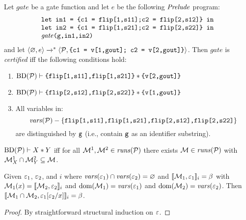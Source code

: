 \begin{definition}
  \label{definition-gmwgate-certification}
  Let $\mathit{gate}$ be a gate function and let $e$ be the following
  $\mathit{Prelude}$ program:
  $$
  \begin{array}{l}
    \texttt{let in1 = \{c1 = flip[1,s11];c2 = flip[2,s12]\} in}\\
    \texttt{let in2 = \{c1 = flip[1,s21];c2 = flip[2,s22]\} in}\\
    \mathit{gate}\texttt{(g,in1,in2)}
  \end{array}
  $$
  and let $
  \langle \varnothing,e \rangle\xrightarrow{}^{*}\langle \mathcal{P},\texttt{\{c1 = v[1,gout]; c2 = v[2,gout]\}} \rangle
  $.
  Then $\mathit{gate}$ is \emph{certified} iff the following conditions hold:
  \begin{enumerate}[\hspace{5mm}i.]
  \item $\mathrm{BD}(\mathcal{P}) \vdash \texttt{\{flip[1,s11],flip[1,s21]\}} * \texttt{\{v[2,gout]\}}$
  \item $\mathrm{BD}(\mathcal{P}) \vdash \texttt{\{flip[2,s12],flip[2,s22]\}} * \texttt{\{v[1,gout]\}}$
  \item All variables in:$$\mathit{vars}(\mathcal{P}) - \{ \texttt{flip[1,s11],flip[1,s21],flip[2,s12],flip[2,s22]}\}$$
    are distinguished by $\texttt{g}$ (i.e., contain $\texttt{g}$ as an identifier substring). 
  \end{enumerate}
\end{definition}

\begin{lemma}
  \label{lemma-sepjoin}
  $\mathrm{BD}(\mathcal{P}) \vdash X * Y$ iff for all 
  $\mathcal{M}^1, \mathcal{M}^2 \in \mathit{runs}(\mathcal{P})$ there exists
  $\mathcal{M} \in \mathit{runs}(\mathcal{P})$ with
  $\mathcal{M}^1_{X} \cap \mathcal{M}^2_{Y} \subseteq \mathcal{M}$.
\end{lemma}

\begin{lemma}
  \label{lemma-presub}
  Given $\varepsilon_1$, $\varepsilon_2$, and $i$ where $\mathit{vars}(\varepsilon_1) \cap
  \mathit{vars}(\varepsilon_2) = \varnothing$ and $\llbracket \mathcal{M}_1,\varepsilon_1 \rrbracket_{i} = \beta$
  with $\mathcal{M}_1(x) = \llbracket \mathcal{M}_2,\varepsilon_2 \rrbracket_{i}$ and
  $\mathrm{dom}(\mathcal{M}_1) = \mathit{vars}(\varepsilon_1)$ and $\mathrm{dom}(\mathcal{M}_2) = \mathit{vars}(\varepsilon_2)$.
  Then $\llbracket \mathcal{M}_1\cap\mathcal{M}_2,\varepsilon_1[\varepsilon_2/x] \rrbracket_{i} = \beta$.
\end{lemma}
\begin{proof}
By straightforward structural induction on $\varepsilon$.
\end{proof}

